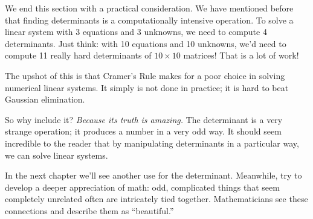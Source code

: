 %
%
%
%
%

We end this section with a practical consideration. We have mentioned before that finding determinants is a computationally intensive operation. To solve a linear system with 3 equations and 3 unknowns, we need to compute 4 determinants. Just think: with 10 equations and 10 unknowns, we'd need to compute 11 really hard determinants of $10\times 10$ matrices! That is a lot of work!

The upshot of this is that Cramer's Rule makes for a poor choice in solving numerical linear systems. It simply is not done in practice; it is hard to beat Gaussian elimination.


So why include it? \textit{Because its truth is amazing.} The determinant is a very strange operation; it produces a number in a very odd way. It should seem incredible to the reader that by manipulating determinants in a particular way, we can solve linear systems.  


In the next chapter we'll see another use for the determinant. Meanwhile, try to develop a deeper appreciation of math: odd, complicated things that seem completely unrelated often are intricately tied together. Mathematicians see these connections and describe them as ``beautiful.''


